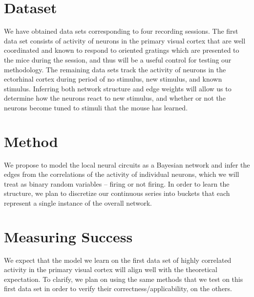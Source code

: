 \documentclass{article}
\begin{document}
\section*{Dataset}

We have obtained data sets corresponding to four recording sessions. The first 
data set consists of activity of neurons in the primary visual cortex that are 
well coordinated and known to respond to oriented gratings which are presented 
to the mice during the session, and thus will be a useful control for testing 
our methodology. The remaining data sets track the activity of neurons in the 
ectorhinal cortex during period of no stimulus, new stimulus, and known 
stimulus. Inferring both network structure and edge weights will allow us to 
determine how the neurons react to new stimulus, and whether or not the 
neurons become tuned to stimuli that the mouse has learned. \par

\section*{Method}

We propose to model the local neural circuits as a Bayesian network and infer 
the edges from the correlations of the activity of individual neurons, which 
we will treat as binary random variables – firing or not firing. In order to 
learn the structure, we plan to discretize our continuous series into buckets 
that each represent a single instance of the overall network. \par

\section*{Measuring Success}

We expect that the model we learn on the first data set of highly correlated 
activity in the primary visual cortex will align well with the theoretical 
expectation. To clarify, we plan on using the same methods that we test on 
this first data set in order to verify their correctness/applicability, on the 
others. \par





\end{document}
